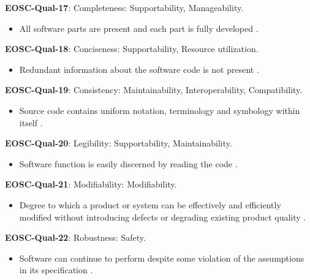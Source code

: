 \textbf{EOSC-Qual-17}: Completeness: Supportability, Manageability.

\begin{itemize}
    \item All software parts are present and each part is fully developed \cite{iso_25010_2011_2017,boehm_quantitative_1976}.
\end{itemize}

\textbf{EOSC-Qual-18}: Conciseness: Supportability, Resource utilization.

\begin{itemize}
    \item Redundant information about the software code is not present \cite{boehm_quantitative_1976}.
\end{itemize}

\textbf{EOSC-Qual-19}: Consistency: Maintainability, Interoperability, Compatibility.

\begin{itemize}
    \item Source code contains uniform notation, terminology and symbology within itself \cite{boehm_quantitative_1976,raymond_software_2013}.
\end{itemize}

\textbf{EOSC-Qual-20}: Legibility: Supportability, Maintainability.

\begin{itemize}
    \item Software function is easily discerned by reading the code \cite{boehm_quantitative_1976}.
\end{itemize}

\textbf{EOSC-Qual-21}: Modifiability: Modifiability.

\begin{itemize}
    \item Degree to which a product or system can be effectively and efficiently modified without introducing defects or degrading existing product quality \cite{iso_25010_2011_2017,boehm_quantitative_1976}.
\end{itemize}

\textbf{EOSC-Qual-22}: Robustness: Safety.

\begin{itemize}
    \item Software can continue to perform despite some violation of the assumptions in its specification \cite{boehm_quantitative_1976}.
\end{itemize}

